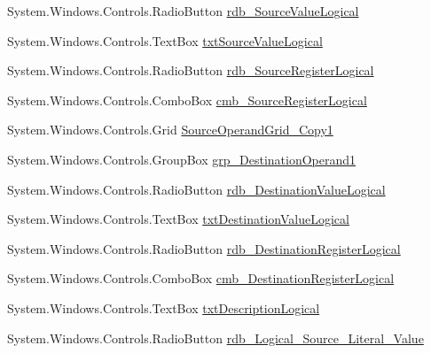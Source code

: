 \begin{DoxyCompactItemize}
\item 
System.\+Windows.\+Controls.\+Radio\+Button \hyperlink{class_c_p_u___o_s___simulator_1_1_instructions_window_ad0e882b0d6d067460309ae6f1dda5d56}{rdb\+\_\+\+Source\+Value\+Logical}
\item 
System.\+Windows.\+Controls.\+Text\+Box \hyperlink{class_c_p_u___o_s___simulator_1_1_instructions_window_afac2309550dd6f1f1589dc7451e8f878}{txt\+Source\+Value\+Logical}
\item 
System.\+Windows.\+Controls.\+Radio\+Button \hyperlink{class_c_p_u___o_s___simulator_1_1_instructions_window_ab8c8622e8a96238fb88e455d60c51e78}{rdb\+\_\+\+Source\+Register\+Logical}
\item 
System.\+Windows.\+Controls.\+Combo\+Box \hyperlink{class_c_p_u___o_s___simulator_1_1_instructions_window_a46a9647a5a6e661afb789b1faa95a15a}{cmb\+\_\+\+Source\+Register\+Logical}
\item 
System.\+Windows.\+Controls.\+Grid \hyperlink{class_c_p_u___o_s___simulator_1_1_instructions_window_a685393ff28189e8c998e2a7dc6018b32}{Source\+Operand\+Grid\+\_\+\+Copy1}
\item 
System.\+Windows.\+Controls.\+Group\+Box \hyperlink{class_c_p_u___o_s___simulator_1_1_instructions_window_ab89f01ff39ce6f5ed461fcf5242be3a5}{grp\+\_\+\+Destination\+Operand1}
\item 
System.\+Windows.\+Controls.\+Radio\+Button \hyperlink{class_c_p_u___o_s___simulator_1_1_instructions_window_a73ba820a305842d3dea1ad79e6e87e6d}{rdb\+\_\+\+Destination\+Value\+Logical}
\item 
System.\+Windows.\+Controls.\+Text\+Box \hyperlink{class_c_p_u___o_s___simulator_1_1_instructions_window_af1a2860f125c3a8e25c73c1b04290438}{txt\+Destination\+Value\+Logical}
\item 
System.\+Windows.\+Controls.\+Radio\+Button \hyperlink{class_c_p_u___o_s___simulator_1_1_instructions_window_a3670f5971b586bd8977a78bcde185a35}{rdb\+\_\+\+Destination\+Register\+Logical}
\item 
System.\+Windows.\+Controls.\+Combo\+Box \hyperlink{class_c_p_u___o_s___simulator_1_1_instructions_window_aefcd87b5db00ac68e7d80ac5fddce8c5}{cmb\+\_\+\+Destination\+Register\+Logical}
\item 
System.\+Windows.\+Controls.\+Text\+Box \hyperlink{class_c_p_u___o_s___simulator_1_1_instructions_window_ae465810d61bb136b7934563cf85b3027}{txt\+Description\+Logical}
\item 
System.\+Windows.\+Controls.\+Radio\+Button \hyperlink{class_c_p_u___o_s___simulator_1_1_instructions_window_a47d79c6d909cd6fd61f0aec69e9c8619}{rdb\+\_\+\+Logical\+\_\+\+Source\+\_\+\+Literal\+\_\+\+Value}

\end{DoxyCompactItemize}
